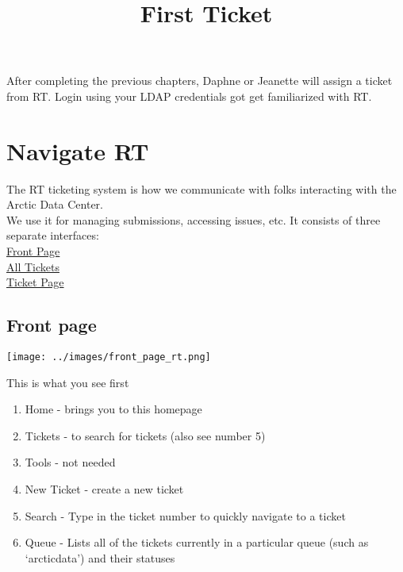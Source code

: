 \documentclass[
  letterpaper,
  DIV=11,
  numbers=noendperiod]{scrreprt}
\title{First Ticket}
\author{}
\date{}
\providecommand{\tightlist}{%
  \setlength{\itemsep}{0pt}\setlength{\parskip}{0pt}}\usepackage{longtable,booktabs,array}
\begin{document}
\maketitle
\ifdefined\Shaded\renewenvironment{Shaded}{\begin{tcolorbox}[borderline west={3pt}{0pt}{shadecolor}, frame hidden, enhanced, interior hidden, breakable, sharp corners, boxrule=0pt]}{\end{tcolorbox}}\fi

After completing the previous chapters, Daphne or Jeanette will assign a
ticket from RT. Login using your LDAP credentials got get familiarized
with RT.

\hypertarget{navigate-rt}{%
\section{Navigate RT}\label{navigate-rt}}

The RT ticketing system is how we communicate with folks interacting
with the Arctic Data Center.\\
We use it for managing submissions, accessing issues, etc. It consists
of three separate interfaces:\\
\protect\hyperlink{front-page}{Front Page}\\
\protect\hyperlink{all-tickets}{All Tickets}\\
\protect\hyperlink{example-ticket}{Ticket Page}

\hypertarget{front-page}{%
\subsection{Front page}\label{front-page}}

\texttt{[image: ../images/front\_page\_rt.png]}

This is what you see first

\begin{enumerate}
\def\labelenumi{\arabic{enumi}.}
\tightlist
\item
  Home - brings you to this homepage\\
\item
  Tickets - to search for tickets (also see number 5)\\
\item
  Tools - not needed\\
\item
  New Ticket - create a new ticket\\
\item
  Search - Type in the ticket number to quickly navigate to a ticket\\
\item
  Queue - Lists all of the tickets currently in a particular queue (such
  as `arcticdata') and their statuses\\
\end{enumerate}
\end{document}
